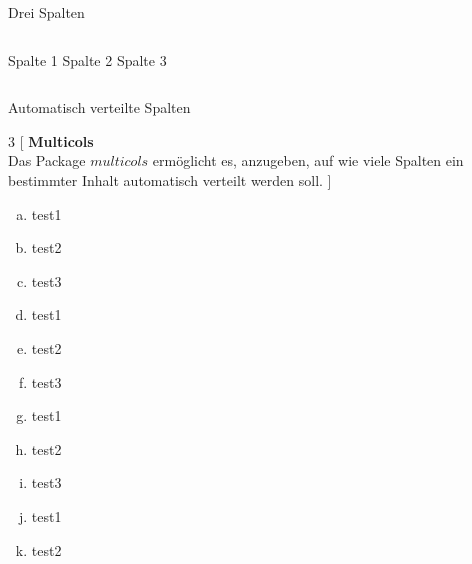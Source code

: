 \documentclass[ngerman,14pt,aspectratio=1610]{beamer}
\begin{document}
		
	\begin{frame}[t]{Drei Spalten} \vspace{10pt}
		\begin{columns}[onlytextwidth]
			Spalte 1
			Spalte 2
			Spalte 3
		\end{columns}
	\end{frame}
	
	\begin{frame}{Automatisch verteilte Spalten}
		\begin{multicols*}{3}
			[
			\textbf{Multicols} \\
			Das Package $multicols$ ermöglicht es, anzugeben, auf wie viele Spalten ein bestimmter Inhalt automatisch verteilt werden soll.
			]
			\begin{enumerate}[a)]
				\item test1
				\item test2
				\item test3
				\item test1
				\item test2
				\item test3
				\item test1
				\item test2
				\item test3
				\item test1
				\item test2
			\end{enumerate}
		\end{multicols*}
	\end{frame}
	
\end{document}
